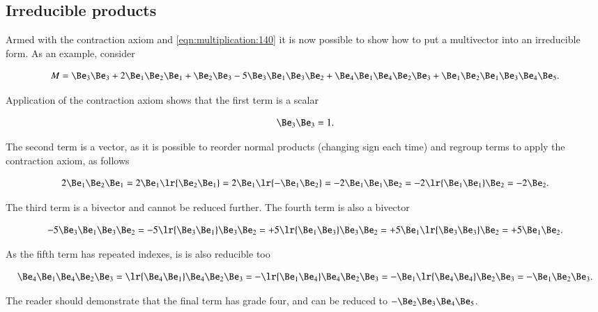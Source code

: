 
\subsection{Irreducible products}

Armed with the contraction axiom and \cref{eqn:multiplication:140} it is now possible to show how to put a multivector into an irreducible form.  As an example, consider

\begin{equation}\label{eqn:SimpleProducts:20}
M = \Be_3 \Be_3 + 2 \Be_1 \Be_2 \Be_1 + \Be_2 \Be_3 - 5 \Be_3 \Be_1 \Be_3 \Be_2 + \Be_4 \Be_1 \Be_4 \Be_2 \Be_3 + \Be_1 \Be_2 \Be_1 \Be_3 \Be_4 \Be_5.
\end{equation}

Application of the contraction axiom shows that the first term is a scalar

\begin{equation}\label{eqn:SimpleProducts:40}
\Be_3 \Be_3 = 1.
\end{equation}

The second term is a vector, as it is possible to reorder normal products (changing sign each time) and regroup terms to apply the contraction axiom, as follows

\begin{dmath}\label{eqn:SimpleProducts:60}
2 \Be_1 \Be_2 \Be_1
=
2 \Be_1 \lr{ \Be_2 \Be_1 }
=
2 \Be_1 \lr{ - \Be_1 \Be_2 }
=
-2 \Be_1 \Be_1 \Be_2
=
-2 \lr{ \Be_1 \Be_1 } \Be_2
=
-2 \Be_2.
\end{dmath}

The third term is a bivector and cannot be reduced further.  The fourth term is also a bivector

\begin{dmath}\label{eqn:SimpleProducts:80}
- 5 \Be_3 \Be_1 \Be_3 \Be_2
=
- 5 \lr{ \Be_3 \Be_1 } \Be_3 \Be_2
=
+ 5 \lr{ \Be_1 \Be_3 } \Be_3 \Be_2
=
+ 5 \Be_1 \lr{ \Be_3 \Be_3 } \Be_2
=
+ 5 \Be_1 \Be_2.
\end{dmath}

As the fifth term has repeated indexes, is is also reducible too

\begin{dmath}\label{eqn:SimpleProducts:100}
\Be_4 \Be_1 \Be_4 \Be_2 \Be_3
=
\lr{ \Be_4 \Be_1} \Be_4 \Be_2 \Be_3
=
-\lr{ \Be_1 \Be_4} \Be_4 \Be_2 \Be_3
=
- \Be_1 \lr{ \Be_4 \Be_4 } \Be_2 \Be_3
=
- \Be_1 \Be_2 \Be_3.
\end{dmath}

The reader should demonstrate that the final term has grade four, and can be reduced to \( -\Be_2 \Be_3 \Be_4 \Be_5 \).

